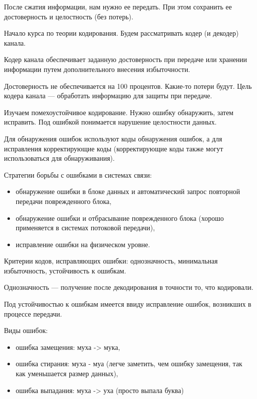 {После сжатия информации, нам нужно ее передать. При этом сохранить ее
достоверность и целостность (без потерь).

Начало курса по теории кодирования. Будем рассматривать кодер (и декодер) канала.

Кодер канала обеспечивает заданную достоверность при передаче или хранении
информации путем дополнительного внесения избыточности.

Достоверность не обеспечивается на 100 процентов. Какие-то потери будут. Цель
кодера канала --- обработать информацию для защиты при передаче.

Изучаем помехоустойчивое кодирование. Нужно ошибку обнаружить, затем исправить.
Под ошибкой понимается нарушение целостности данных.

Для обнаружения ошибок используют коды обнаружения ошибок, а для исправления
корректирующие коды (корректирующие коды также могут использоваться для
обнаруживания).

Стратегии борьбы с ошибками в системах связи:
\begin{itemize}
    \item обнаружение ошибки в блоке данных и автоматический запрос повторной
        передачи поврежденного блока,

    \item обнаружение ошибки и отбрасывание поврежденного блока (хорошо
        применяется в системах потоковой передачи),

    \item исправление ошибки на физическом уровне.
\end{itemize}

Критерии кодов, исправляющих ошибки: однозначность, минимальная избыточность,
устойчивость к ошибкам.

Однозначность --- получение после декодирования в точности то, что кодировали.

Под устойчивостью к ошибкам имеется ввиду исправление ошибок, возникших в
процессе передачи.

Виды ошибок:
\begin{itemize}
    \item ошибка замещения: муха -> мука,
        
    \item ошибка стирания: муха - муа (легче заметить, чем ошибку замещения,
        так как уменьшается размер данных),

    \item ошибка выпадания: муха -> уха (просто выпала буква)


\end{itemize}}
